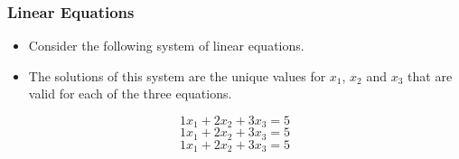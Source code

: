 \documentclass{beamer}
\begin{document}

\begin{frame}
\frametitle{Linear Equations}
{
\large
\begin{itemize}
\item Consider the following system of linear equations. \item The solutions of this system are the unique values for $x_1$, $x_2$ and $x_3$ that are valid for each of the three equations.
\end{itemize}
\[1x_1 + 2x_2 + 3x_3 = 5 \]
\[1x_1 + 2x_2 + 3x_3 = 5 \]
\[1x_1 + 2x_2 + 3x_3 = 5 \]

}
\end{frame}
\end{document}
